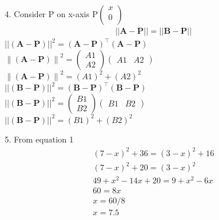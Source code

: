 \documentclass[journal,10pt,twocolumn]{article}
\newcommand{\myvec}[1]{\ensuremath{\begin{pmatrix}#1\end{pmatrix}}}
\let\vec\mathbf
\begin{document}
\raggedright 4. Consider P on x-axis P$\begin{pmatrix}
  x \\
  0 \\
 \end{pmatrix}$           \vspace{3mm}
\begin{align}
	||\vec{A-P}|| = ||\vec{B-P}||
\end{align}  
    $||\vec{(A-P)}||^2 = \vec{{(A-P)}^{\top}{(A-P)}}$\\
    
$ \vec{\|(A-P)\|}^2 = \myvec{A1\\A2}\myvec{A1 & A2}$ \\
$ \vec{\|(A-P)\|}^2 = (A1)^2+(A2)^2$ \\
    $||\vec{(B-P)}||^2 =  \vec{{(B-P)}^{\top}{(B-P)}}$\\   
    $||\vec{(B-P)}||^2 = \myvec{B1\\B2}\myvec{B1 & B2}$\\
    $||\vec{(B-P)}||^2 = (B1)^2+(B2)^2$ \\
    \vspace{1mm}
 \raggedright 5. From equation 1 
 \\
    \vspace{1mm}            
\begin{gather*}
 (7-x)^2+36=(3-x)^2+16\\                      
 (7-x)^2+20=(3-x)^2\\                         
 49+x^2-14x+20=9+x^2-6x\\                     
 60=8x\\                                    
 x=60/8\\                               
 x=7.5   
\end{gather*}               			
\end{document}
